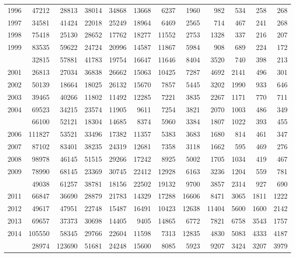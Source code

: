 \documentclass[
]{article}
\begin{document}
\begin{longtable}[t]{lrrrrrrrrrrr}
1996 & 47212 & 28813 & 38014 & 34868 & 13668 & 6237 & 1960 & 982 & 534 & 258 & 268\\
1997 & 34581 & 41424 & 22018 & 25249 & 18964 & 6469 & 2565 & 714 & 467 & 241 & 268\\
1998 & 75418 & 25130 & 28652 & 17762 & 18277 & 11552 & 2753 & 1328 & 337 & 216 & 207\\
1999 & 83535 & 59622 & 24724 & 20996 & 14587 & 11867 & 5984 & 908 & 689 & 224 & 172\\
\addlinespace
2000 & 32815 & 57881 & 41783 & 19754 & 16647 & 11646 & 8404 & 3520 & 740 & 398 & 213\\
2001 & 26813 & 27034 & 36838 & 26662 & 15063 & 10425 & 7287 & 4692 & 2141 & 496 & 301\\
2002 & 50139 & 18664 & 18025 & 26132 & 15670 & 7857 & 5445 & 3202 & 1990 & 933 & 646\\
2003 & 39465 & 40266 & 11802 & 11492 & 12285 & 7221 & 3835 & 2267 & 1171 & 770 & 711\\
2004 & 69523 & 34215 & 23574 & 11905 & 9611 & 7254 & 3821 & 2070 & 1003 & 486 & 349\\
\addlinespace
2005 & 66100 & 52121 & 18304 & 14685 & 8374 & 5960 & 3384 & 1807 & 1022 & 393 & 455\\
2006 & 111827 & 53521 & 33496 & 17382 & 11357 & 5383 & 3683 & 1680 & 814 & 461 & 347\\
2007 & 87102 & 83401 & 38235 & 24319 & 12681 & 7358 & 3118 & 1662 & 595 & 469 & 276\\
2008 & 98978 & 46145 & 51515 & 29266 & 17242 & 8925 & 5002 & 1705 & 1034 & 419 & 467\\
2009 & 78990 & 68145 & 23369 & 30745 & 22412 & 12928 & 6163 & 3236 & 1204 & 559 & 781\\
\addlinespace
2010 & 49038 & 61257 & 38781 & 18156 & 22502 & 19132 & 9700 & 3857 & 2314 & 927 & 690\\
2011 & 66847 & 36690 & 28879 & 21783 & 14329 & 17288 & 16606 & 8471 & 3065 & 1811 & 1222\\
2012 & 49617 & 47951 & 22748 & 15487 & 16491 & 10423 & 12638 & 11404 & 5600 & 1600 & 2142\\
2013 & 69657 & 37373 & 30698 & 14405 & 9405 & 14865 & 6772 & 7821 & 6758 & 3543 & 1757\\
2014 & 105550 & 58345 & 29766 & 22604 & 11598 & 7313 & 12835 & 4830 & 5083 & 4333 & 4187\\
\addlinespace
2015 & 28974 & 123690 & 51681 & 24248 & 15600 & 8085 & 5923 & 9207 & 3424 & 3207 & 3979\\

\end{longtable}
\end{document}
